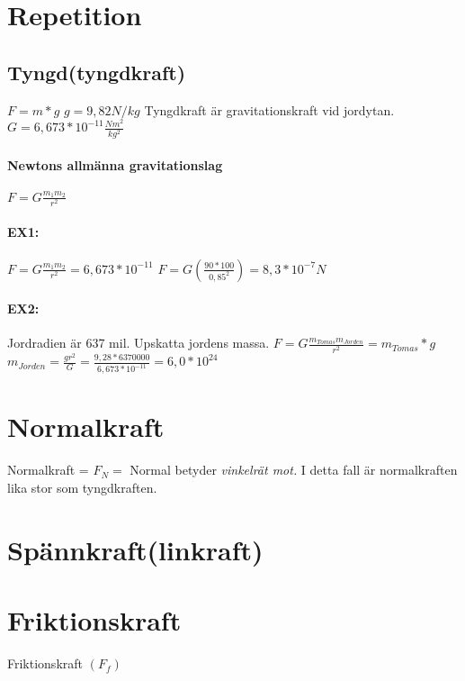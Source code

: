 \documentclass[a4paper,11pt]{article}
\begin{document}
\begin{flushleft}
\section{Repetition}
\subsection{Tyngd(tyngdkraft)}
$ F=m*g $\newline
$ g=9,82 N/kg $\newline
Tyngdkraft är gravitationskraft vid jordytan.\newline
$ G=6,673*10^{-11}\frac{Nm^2}{kg^2} $
\paragraph{Newtons allmänna gravitationslag}
$ F=G\frac{m_1 m_2}{r^2} $
\paragraph{EX1:}
$ F=G\frac{m_1 m_2}{r^2}=6,673*10^{-11} $\newline
$ F=G(\frac{90*100}{0,85^2})=8,3*10^{-7}N $\newline
\paragraph{EX2:}
Jordradien är 637 mil. Upskatta jordens massa.\newline
$ F=G\frac{m_{Tomas} m_{Jorden}}{r^2}=m_{Tomas}*g $\newline
$ m_{Jorden}=\frac{gr^2}{G}=\frac{9,28*6370000}{6,673*10^{-11}}=6,0*10^{24} $
\section{Normalkraft}
Normalkraft = $F_N=$\newline
Normal betyder \textit{vinkelrät mot.}\newline
I detta fall är normalkraften lika stor som tyngdkraften.
\section{Spännkraft(linkraft)}
\section{Friktionskraft}
Friktionskraft $( F_f )$\newline
\end{flushleft}
\end{document}
